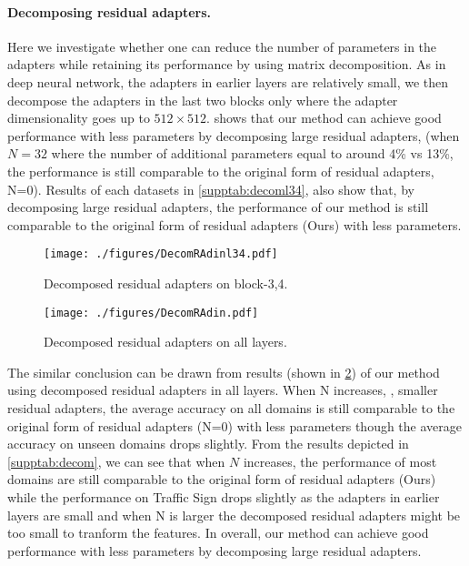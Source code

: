 \paragraph{Decomposing residual adapters.}
Here we investigate whether one can reduce the number of parameters in the adapters while retaining its performance by using matrix decomposition.
As in deep neural network, the adapters in earlier layers are relatively small, we then decompose the adapters in the last two blocks only where the adapter dimensionality goes up to $512\times 512$.  shows that our method can achieve good performance with less parameters by decomposing large residual adapters, (\eg when $N=32$ where the number of additional parameters equal to around 4\% vs 13\%, the performance is still comparable to the original form of residual adapters, \ie N=0). Results of each datasets in \cref{supptab:decoml34}, also show that, by decomposing large residual adapters, the performance of our method is still comparable to the original form of residual adapters (\ie Ours) with less parameters.

\begin{figure}[h]

\begin{center}

\texttt{[image: ./figures/DecomRAdinl34.pdf]}
\end{center}
\vspace{-0.3in}
\caption{Decomposed residual adapters on block-3,4.}
\label{suppfig:urldecoml34}
\end{figure}

\begin{figure}[h]
\begin{center}
\texttt{[image: ./figures/DecomRAdin.pdf]}
\end{center}
\vspace{-0.3in}
\caption{Decomposed residual adapters on all layers.}
\label{suppfig:urldecom}
\end{figure}




The similar conclusion can be drawn from results (shown in \cref{suppfig:urldecom}) of our method using decomposed residual adapters in all layers. When N increases, \ie, smaller residual adapters, the average accuracy on all domains is still comparable to the original form of residual adapters (\ie N=0) with less parameters though the average accuracy on unseen domains drops slightly. From the results depicted in \cref{supptab:decom}, we can see that when $N$ increases, the performance of most domains are still comparable to the original form of residual adapters (\ie Ours) while the performance on Traffic Sign drops slightly as the adapters in earlier layers are small and when N is larger the decomposed residual adapters might be too small to tranform the features. In overall, our method can achieve good performance with less parameters by decomposing large residual adapters.

